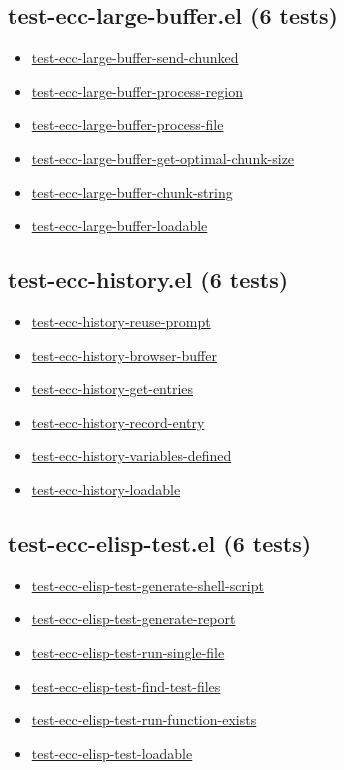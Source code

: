 \documentclass[11pt]{article}
\begin{document}
\subsection{test-ecc-large-buffer.el (6 tests)}
\label{sec:orgebb7e75}
\begin{itemize}
\item \href{test-ecc-large-buffer.el}{test-ecc-large-buffer-send-chunked}
\item \href{test-ecc-large-buffer.el}{test-ecc-large-buffer-process-region}
\item \href{test-ecc-large-buffer.el}{test-ecc-large-buffer-process-file}
\item \href{test-ecc-large-buffer.el}{test-ecc-large-buffer-get-optimal-chunk-size}
\item \href{test-ecc-large-buffer.el}{test-ecc-large-buffer-chunk-string}
\item \href{test-ecc-large-buffer.el}{test-ecc-large-buffer-loadable}
\end{itemize}
\subsection{test-ecc-history.el (6 tests)}
\label{sec:orgd871efd}
\begin{itemize}
\item \href{test-ecc-history.el}{test-ecc-history-reuse-prompt}
\item \href{test-ecc-history.el}{test-ecc-history-browser-buffer}
\item \href{test-ecc-history.el}{test-ecc-history-get-entries}
\item \href{test-ecc-history.el}{test-ecc-history-record-entry}
\item \href{test-ecc-history.el}{test-ecc-history-variables-defined}
\item \href{test-ecc-history.el}{test-ecc-history-loadable}
\end{itemize}
\subsection{test-ecc-elisp-test.el (6 tests)}
\label{sec:org6927930}
\begin{itemize}
\item \href{test-ecc-elisp-test.el}{test-ecc-elisp-test-generate-shell-script}
\item \href{test-ecc-elisp-test.el}{test-ecc-elisp-test-generate-report}
\item \href{test-ecc-elisp-test.el}{test-ecc-elisp-test-run-single-file}
\item \href{test-ecc-elisp-test.el}{test-ecc-elisp-test-find-test-files}
\item \href{test-ecc-elisp-test.el}{test-ecc-elisp-test-run-function-exists}
\item \href{test-ecc-elisp-test.el}{test-ecc-elisp-test-loadable}
\end{itemize}
\end{document}
